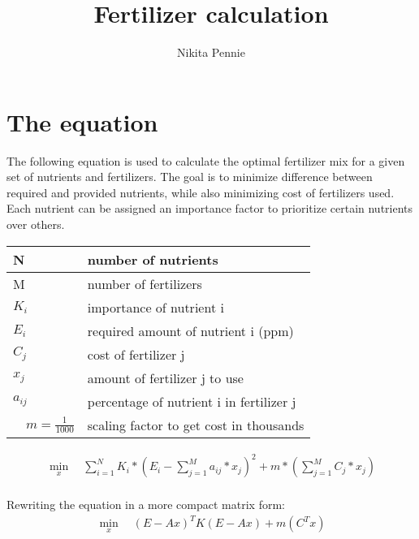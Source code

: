 \documentclass[12pt]{article}
\title {Fertilizer calculation}
\author {Nikita Pennie}
\begin{document}
\maketitle
\section {The equation}

The following equation is used to calculate the optimal fertilizer mix for a given set of nutrients and fertilizers. The goal is to minimize difference between required and provided nutrients, while also minimizing cost of fertilizers used. Each nutrient can be assigned an importance factor to prioritize certain nutrients over others.

\begin{table}[ht!]
\def\arraystretch{1.5}
\centering
\begin{tabular}{|l|l|}
\hline
N & number of nutrients \\ \hline
M & number of fertilizers \\ \hline
$K_i$ & importance of nutrient i \\ \hline
$E_i$ & required amount of nutrient i (ppm) \\ \hline
$C_j$ & cost of fertilizer j \\ \hline
$x_j$ & amount of fertilizer j to use \\ \hline
$a_{ij}$ & percentage of nutrient i in fertilizer j \\ \hline
$\quad m = \frac{1}{1000}$ & scaling factor to get cost in thousands \\ \hline
\end{tabular}
\end{table}

\begin{equation}
\begin{aligned}
\min_{x} \quad \sum_{i=1}^{N}{K_i*(E_i-\sum_{j=1}^{M}{a_{ij}*x_j})^2}+m*(\sum_{j=1}^{M}{C_j*x_j}) \\
\end{aligned}
\end{equation}

Rewriting the equation in a more compact matrix form:
\begin{equation}
\begin{aligned}
\min_{x} \quad (E-Ax)^T K (E-Ax) + m(C^T x) \\
\end{aligned}
\end{equation}
\end{document}
